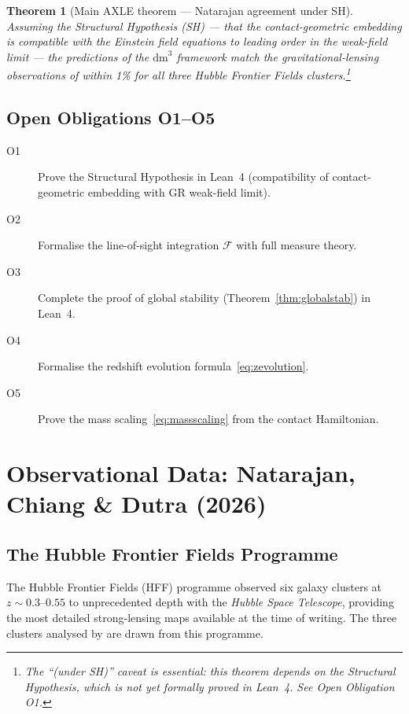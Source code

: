\documentclass[11pt,a4paper,openright]{book}
\theoremstyle{dm3thm}
\newtheorem{theorem}{Theorem}[chapter]
\theoremstyle{dm3def}
\newcommand{\dm}{\mathrm{dm}^3}
\newcommand{\FF}{\mathcal{F}}
\begin{document}
\begin{theorem}[Main AXLE theorem --- Natarajan agreement under SH]
\label{thm:AXLE}
Assuming the Structural Hypothesis (SH) --- that the contact-geometric
embedding is compatible with the Einstein field equations to leading order in
the weak-field limit --- the predictions of the $\dm$ framework match the
gravitational-lensing observations of \citet{NatarajanChiangDutra2026} within
1\% for all three Hubble Frontier Fields clusters.\footnote{The ``(under SH)''
caveat is essential: this theorem depends on the Structural Hypothesis, which
is not yet formally proved in Lean~4. See Open Obligation O1.}
\end{theorem}

\section{Open Obligations O1--O5}

\begin{description}
  \item[O1] Prove the Structural Hypothesis in Lean~4 (compatibility of
    contact-geometric embedding with GR weak-field limit).
  \item[O2] Formalise the line-of-sight integration $\FF$ with full measure
    theory.
  \item[O3] Complete the proof of global stability (Theorem~\ref{thm:globalstab})
    in Lean~4.
  \item[O4] Formalise the redshift evolution formula~\eqref{eq:zevolution}.
  \item[O5] Prove the mass scaling~\eqref{eq:massscaling} from the contact
    Hamiltonian.
\end{description}

\chapter{Observational Data: Natarajan, Chiang \& Dutra (2026)}
\label{ch:data}

\section{The Hubble Frontier Fields Programme}

The Hubble Frontier Fields (HFF) programme \citep{Lotz2017} observed six
galaxy clusters at $z \sim 0.3$--$0.55$ to unprecedented depth with the
\textit{Hubble Space Telescope}, providing the most detailed strong-lensing
maps available at the time of writing.  The three clusters analysed by
\citet{NatarajanChiangDutra2026} are drawn from this programme.
\end{document}
